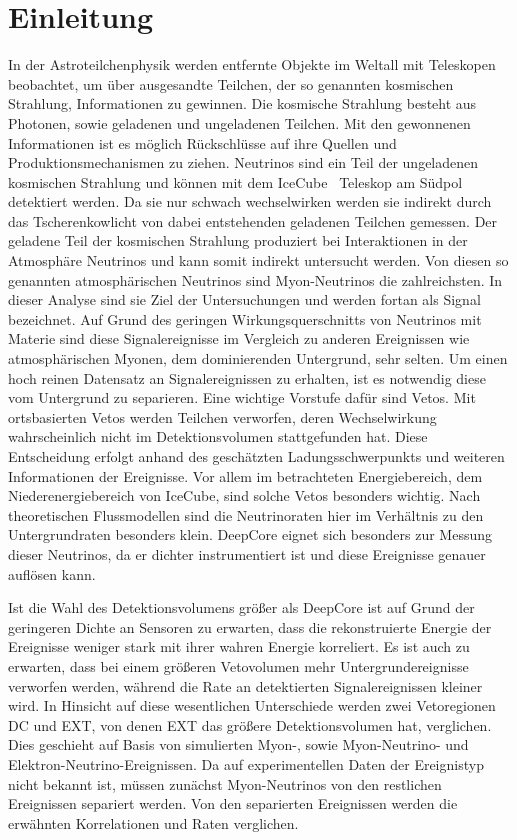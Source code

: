 \chapter{Einleitung}

In der Astroteilchenphysik werden entfernte Objekte im Weltall mit Teleskopen beobachtet, um über ausgesandte Teilchen, der so genannten kosmischen Strahlung, Informationen zu gewinnen.
Die kosmische Strahlung besteht aus Photonen, sowie geladenen und ungeladenen Teilchen.
Mit den gewonnenen Informationen ist es möglich Rückschlüsse auf ihre Quellen und Produktionsmechanismen zu ziehen.
Neutrinos sind ein Teil der ungeladenen kosmischen Strahlung und können mit dem IceCube~\cite{icecube-detector-reference} Teleskop am Südpol detektiert werden. 
Da sie nur schwach wechselwirken werden sie indirekt durch das Tscherenkowlicht von dabei entstehenden geladenen Teilchen gemessen.
Der geladene Teil der kosmischen Strahlung produziert bei Interaktionen in der Atmosphäre Neutrinos und kann somit indirekt untersucht werden.
Von diesen so genannten atmosphärischen Neutrinos sind Myon-Neutrinos die zahlreichsten. 
In dieser Analyse sind sie Ziel der Untersuchungen und werden fortan als Signal bezeichnet.
Auf Grund des geringen Wirkungsquerschnitts von Neutrinos mit Materie sind diese Signalereignisse im Vergleich zu anderen Ereignissen wie atmosphärischen Myonen, dem dominierenden Untergrund, sehr selten.
Um einen hoch reinen Datensatz an Signalereignissen zu erhalten, ist es notwendig diese vom Untergrund zu separieren.
Eine wichtige Vorstufe dafür sind Vetos.
Mit ortsbasierten Vetos werden Teilchen verworfen, deren Wechselwirkung wahrscheinlich nicht im Detektionsvolumen stattgefunden hat.  
Diese Entscheidung erfolgt anhand des geschätzten Ladungsschwerpunkts und weiteren Informationen der Ereignisse.
Vor allem im betrachteten Energiebereich, dem Niederenergiebereich von IceCube, sind solche Vetos besonders wichtig.
Nach theoretischen Flussmodellen sind die Neutrinoraten hier im Verhältnis zu den Untergrundraten besonders klein. 
DeepCore eignet sich besonders zur Messung dieser Neutrinos, da er dichter instrumentiert ist und diese Ereignisse genauer auflösen kann.

Ist die Wahl des Detektionsvolumens größer als DeepCore ist auf Grund der geringeren Dichte an Sensoren zu erwarten, dass die rekonstruierte Energie der Ereignisse weniger stark mit ihrer wahren Energie korreliert.
Es ist auch zu erwarten, dass bei einem größeren Vetovolumen mehr Untergrundereignisse verworfen werden, während die Rate an detektierten Signalereignissen kleiner wird. 
In Hinsicht auf diese wesentlichen Unterschiede werden zwei Vetoregionen DC und EXT, von denen EXT das größere Detektionsvolumen hat, verglichen.
Dies geschieht auf Basis von simulierten Myon-, sowie Myon-Neutrino- und Elektron-Neutrino-Ereignissen.
Da auf experimentellen Daten der Ereignistyp nicht bekannt ist, müssen zunächst Myon-Neutrinos von den restlichen Ereignissen separiert werden. 
Von den separierten Ereignissen werden die erwähnten Korrelationen und Raten verglichen.

